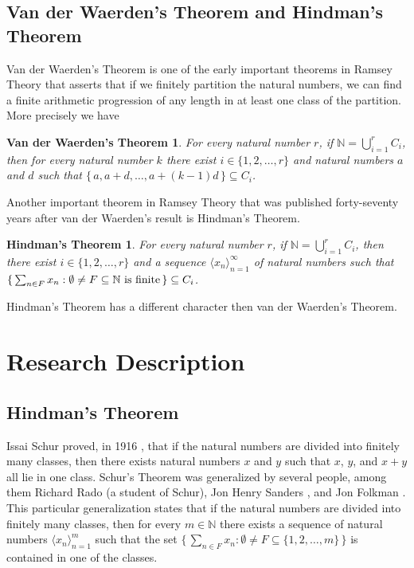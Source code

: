 \documentclass[12pt]{article}
\theoremstyle{plain}
\newtheorem{vdw}[thm]{Van der Waerden's Theorem}
\newtheorem{fst}[thm]{Hindman's Theorem}
\theoremstyle{definition}
\newcommand{\bbN}{\mathbb{N}}
\newcommand{\la}{\langle}
\newcommand{\ra}{\rangle}
\begin{document}
\subsection{Van der Waerden's Theorem and Hindman's Theorem}
Van der Waerden's Theorem is one of the early important theorems in
Ramsey Theory \cite{Van-der-Waerden:1927fk} that asserts that if we
finitely partition the natural numbers, we can find a finite
arithmetic progression of any length in at least one class of the
partition.
More precisely we have
  \begin{vdw}
    For every natural number $r$, if\/ $\bbN = \bigcup_{i=1}^r C_i$,
    then for every natural number $k$ there exist $i \in \{1, 2,
    \ldots, r\}$ and natural numbers $a$ and $d$ such that $\{\, a,
    a+d, \ldots, a+(k-1)d\,\} \subseteq C_i$.
  \end{vdw}
Another important theorem in Ramsey Theory that was published
forty-seventy years after van der Waerden's result is Hindman's
Theorem.
  \begin{fst}
    For every natural number $r$, if\/ $\bbN = \bigcup_{i=1}^r C_i$,
    then there exist $i \in \{1, 2, \ldots, r\}$ and a sequence $\la x_n
    \ra_{n=1}^\infty$ of natural numbers such that $\{\, \sum_{n \in
      F} x_n : \emptyset \ne F \subseteq \bbN \hbox{ is finite} \,\}
    \subseteq C_i$.
  \end{fst}
Hindman's Theorem has a different character then van der Waerden's Theorem.

\section{Research Description}
\subsection{Hindman's Theorem}
Issai Schur proved, in 1916 \cite{Schur:1916fk}, that if the natural
numbers are divided into finitely many classes, then there exists natural
numbers $x$ and $y$ such that $x$, $y$, and $x+y$ all lie in one
class.
Schur's Theorem was generalized by several people, among them Richard
Rado \cite{Rado:1933kx} (a student of Schur), Jon Henry Sanders
\cite{Sanders:1968uq}, and Jon Folkman \cite{Graham:1971vn}.
This particular generalization states that if the natural numbers are
divided into finitely many classes, then for every $m \in \bbN$ there
exists a
sequence of natural numbers $\la x_n \ra_{n=1}^m$ such that the set
$\bigl\{\, \sum_{n \in F} x_n : \emptyset \ne F \subseteq \{1, 2, \ldots,
m\} \,\bigr\}$ is contained in one of the classes.
\end{document}
